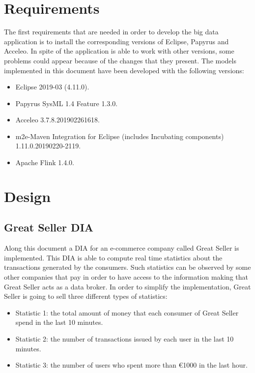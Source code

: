 \section{Requirements}
The first requirements that are needed in order to develop the big data application is to install the corresponding versions of Eclipse, Papyrus and Acceleo. In spite of the application is able to work with other versions, some problems could appear because of the changes that they present. The models implemented in this document have been developed with the following versions:

\begin{itemize}

\item Eclipse 2019-03 (4.11.0).
\item Papyrus SysML 1.4 Feature	1.3.0.
\item Acceleo 3.7.8.201902261618.
\item m2e-Maven Integration for Eclipse (includes Incubating components) 1.11.0.20190220-2119.
\item Apache Flink 1.4.0.

\end{itemize}

\section{Design}
\subsection{Great Seller DIA}
Along this document a DIA for an e-commerce company called Great Seller is implemented. This DIA is able to compute real time statistics about the transactions generated by the consumers. Such statistics can be observed by some other companies that pay in order to have access to the information making that Great Seller acts as a data broker. In order to simplify the implementation, Great Seller is going to sell three different types of statistics:

\begin{itemize}

\item Statistic 1: the total amount of money that each consumer of Great Seller spend in the last 10 minutes.
\item Statistic 2: the number of transactions issued by each user in the last 10 minutes.
\item Statistic 3: the number of users who spent more than \euro{1000} in the last hour.

\end{itemize}

